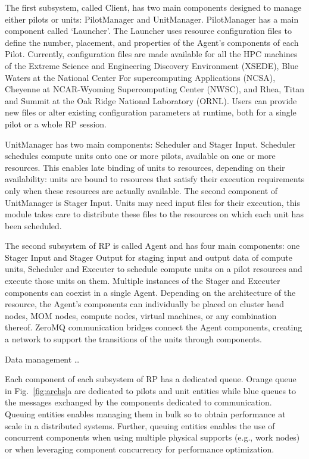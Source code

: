 \documentclass[preprint,12pt, a4paper]{elsarticle}
\begin{document}
The first subsystem, called Client, has two main components designed to
manage either pilots or units: PilotManager and UnitManager. PilotManager has
a main component called `Launcher'. The Launcher uses resource configuration
files to define the number, placement, and properties of the Agent's
components of each Pilot. Currently, configuration files are made available
for all the HPC machines of the Extreme Science and Engineering Discovery
Environment (XSEDE), Blue Waters at the National Center For supercomputing
Applications (NCSA), Cheyenne at NCAR-Wyoming Supercomputing Center (NWSC),
and Rhea, Titan and Summit at the Oak Ridge National Laboratory (ORNL). Users
can provide new files or alter existing configuration parameters at runtime,
both for a single pilot or a whole RP session.

UnitManager has two main components: Scheduler and Stager Input. Scheduler
schedules compute units onto one or more pilots, available on one or more
resources. This enables late binding of units to resources, depending on
their availability: units are bound to resources that satisfy their execution
requirements only when these resources are actually available. The second
component of UnitManager is Stager Input. Units may need input files for
their execution, this module takes care to distribute these files to the
resources on which each unit has been scheduled.

The second subsystem of RP is called Agent and has four main components: one
Stager Input and Stager Output for staging input and output data of compute
units, Scheduler and Executer to schedule compute units on a pilot resources
and execute those units on them. Multiple instances of the Stager and
Executer components can coexist in a single Agent. Depending on the
architecture of the resource, the Agent's components can individually be
placed on cluster head nodes, MOM nodes, compute nodes, virtual machines, or
any combination thereof. ZeroMQ communication bridges connect the Agent
components, creating a network to support the transitions of the units
through components.

Data management \ldots{}

Each component of each subsystem of RP has a dedicated queue. Orange queue in
Fig.~\ref{fig:archs}a are dedicated to pilots and unit entities while blue
queues to the messages exchanged by the components dedicated to
communication. Queuing entities enables managing them in bulk so to obtain
performance at scale in a distributed systems. Further, queuing entities
enables the use of concurrent components when using multiple physical
supports (e.g., work nodes) or when leveraging component concurrency for
performance optimization.
\end{document}
